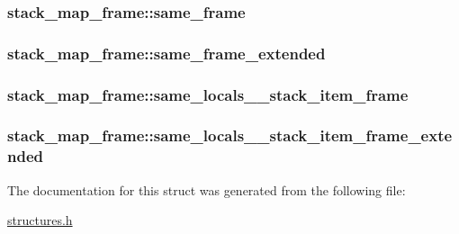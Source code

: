 \subsubsection[{\texorpdfstring{same\+\_\+frame}{same_frame}}]{ stack\+\_\+map\+\_\+frame\+::same\+\_\+frame}\hypertarget{structstack__map__frame_a566369b2c76e233dc18856709be7d3dc}{}\label{structstack__map__frame_a566369b2c76e233dc18856709be7d3dc}
\subsubsection[{\texorpdfstring{same\+\_\+frame\+\_\+extended}{same_frame_extended}}]{ stack\+\_\+map\+\_\+frame\+::same\+\_\+frame\+\_\+extended}\hypertarget{structstack__map__frame_a5fd4fb1c466520e7296b33ca512a844a}{}\label{structstack__map__frame_a5fd4fb1c466520e7296b33ca512a844a}
\subsubsection[{\texorpdfstring{same\+\_\+locals\+\_\+1\+\_\+stack\+\_\+item\+\_\+frame}{same_locals_1_stack_item_frame}}]{ stack\+\_\+map\+\_\+frame\+::same\+\_\+locals\+\_\+\_\+stack\+\_\+item\+\_\+frame}\hypertarget{structstack__map__frame_a4a73bdea158110c9c632ef657acdceed}{}\label{structstack__map__frame_a4a73bdea158110c9c632ef657acdceed}
\subsubsection[{\texorpdfstring{same\+\_\+locals\+\_\+1\+\_\+stack\+\_\+item\+\_\+frame\+\_\+extended}{same_locals_1_stack_item_frame_extended}}]{ stack\+\_\+map\+\_\+frame\+::same\+\_\+locals\+\_\+\_\+stack\+\_\+item\+\_\+frame\+\_\+extended}\hypertarget{structstack__map__frame_acb0262b85b6ddf629227b4e269107c4d}{}\label{structstack__map__frame_acb0262b85b6ddf629227b4e269107c4d}


The documentation for this struct was generated from the following file\+:\begin{DoxyCompactItemize}
\item 
\hyperlink{structures_8h}{structures.\+h}\end{DoxyCompactItemize}
